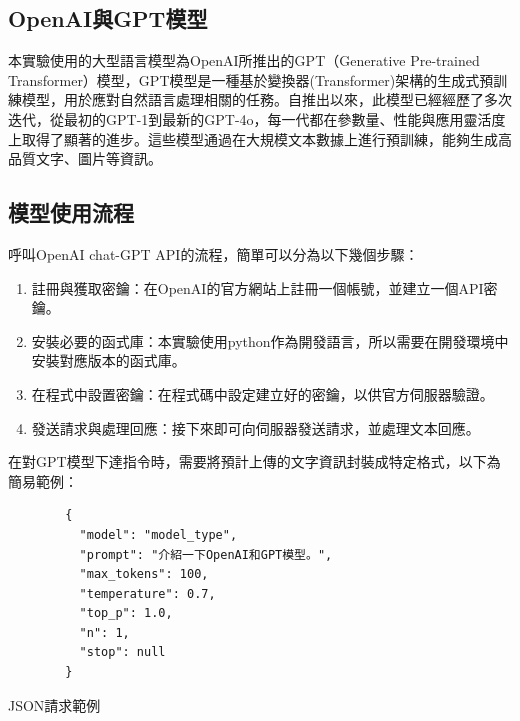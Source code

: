 \documentclass[class=NCU_thesis, crop=false]{standalone}
\begin{document}
\subsection{OpenAI與GPT模型}
本實驗使用的大型語言模型為OpenAI所推出的GPT（Generative Pre-trained Transformer）模型，GPT模型是一種基於變換器(Transformer)架構的生成式預訓練模型，用於應對自然語言處理相關的任務。自推出以來，此模型已經經歷了多次迭代，從最初的GPT-1到最新的GPT-4o，每一代都在參數量、性能與應用靈活度上取得了顯著的進步。這些模型通過在大規模文本數據上進行預訓練，能夠生成高品質文字、圖片等資訊。

\subsection{模型使用流程}
呼叫OpenAI chat-GPT API的流程，簡單可以分為以下幾個步驟：
\begin{enumerate}
    \item 註冊與獲取密鑰：在OpenAI的官方網站上註冊一個帳號，並建立一個API密鑰。
    \item 安裝必要的函式庫：本實驗使用python作為開發語言，所以需要在開發環境中安裝對應版本的函式庫。
    \item 在程式中設置密鑰：在程式碼中設定建立好的密鑰，以供官方伺服器驗證。
    \item 發送請求與處理回應：接下來即可向伺服器發送請求，並處理文本回應。
\end{enumerate}
\newpage
在對GPT模型下達指令時，需要將預計上傳的文字資訊封裝成特定格式，以下為簡易範例：\\

\begin{listing}[h]
    \begin{verbatim}
        {
          "model": "model_type",
          "prompt": "介紹一下OpenAI和GPT模型。",
          "max_tokens": 100,
          "temperature": 0.7,
          "top_p": 1.0,
          "n": 1,
          "stop": null
        }
    \end{verbatim}
\caption{JSON請求範例} 
\end{listing}
\end{document}
